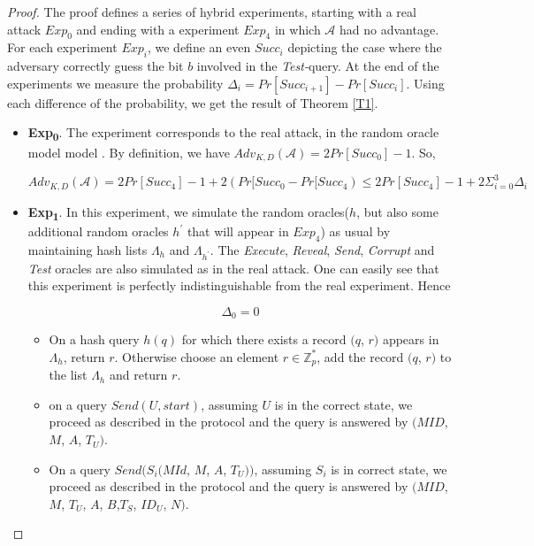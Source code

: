 \documentclass[a4paper,12pt]{report}
\begin{document}
\begin{proof}
The proof defines a series of hybrid experiments, starting with a
real attack $Exp_0$ and ending with a experiment $Exp_4$ in which
$\mathcal{A}$ had no advantage. For each experiment $Exp_i$, we
define an even $Succ_i$ depicting the case where the adversary
correctly guess the bit $b$ involved in the \textit{Test-}query. At
the end of the experiments we measure the probability $\Delta_i =
Pr[Succ_{i+1}]- Pr[Succ_{i}]$. Using each difference of the
probability, we get the result of Theorem \ref{T1}.

\begin{itemize}
\item \textbf{Exp\textsubscript{0}}. The experiment corresponds to the
real attack, in the random oracle model model \cite{bellare}. By
definition, we have $Adv_{K, D}(\mathcal{A})= 2Pr[Succ_{0}] -1$. So,

\begin{equation}\label{eq2}
Adv_{K, D}(\mathcal{A})= 2Pr[Succ_{4}] -1 + 2(Pr[Succ_{0} -
Pr[Succ_{4})\leq 2Pr[Succ_4] - 1 + 2 \Sigma_{i = 0}^3 \Delta_i
\end{equation}

\item \textbf{Exp\textsubscript{1}}. In this experiment, we simulate
the random oracles($h$, but also some additional random oracles
$h^{\prime}$ that will appear in $Exp_4$) as usual by maintaining
hash lists $\Lambda_h$ and $\Lambda_{h^{\prime}}$. The
\textit{Execute}, \textit{Reveal}, \textit{Send}, \textit{Corrupt}
and \textit{Test} oracles are also simulated as in the real attack.
One can easily see that this experiment is perfectly
indistinguishable from the real experiment. Hence

\begin{equation}\label{eq3}
\Delta_0 = 0
\end{equation}

\begin{itemize}
\item On a hash query $h(q)$ for which there exists a record $(q$, $r)$
appears in $\Lambda_h$, return $r$. Otherwise choose an element
$r\in\mathbb{Z}_{p}^{*}$, add the record $(q$, $r)$ to the list
$\Lambda_h$ and return $r$.

\item on a query $Send(U, start)$, assuming $U$ is in the correct state,
we proceed as described in the protocol and the query is answered by
$(MID$, $M$, $A$, $T_U)$.

\item On a query $Send(S_{i}(MId$, $M$, $A$, $T_U))$, assuming $S_{i}$
is in correct state, we proceed as described in the protocol and the
query is answered by  $(MID$, $M$, $T_U$, $A$, $B$,$T_S$, $ID_U$,
$N)$.


\end{itemize}
\end{itemize}
\end{proof}
\end{document}
